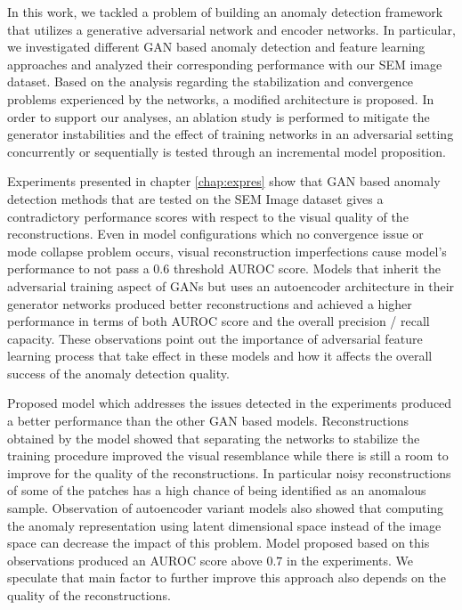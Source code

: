 
\begingroup

In this work, we tackled a problem of building an anomaly detection framework that utilizes a 
generative adversarial network and encoder networks. In particular, we investigated different 
GAN based anomaly detection and feature learning approaches and analyzed their corresponding 
performance with our SEM image dataset. Based on the analysis regarding the stabilization and 
convergence problems experienced by the networks, a modified architecture is proposed. In order to support 
our analyses, an ablation study is performed to mitigate the generator instabilities and the 
effect of training networks in an adversarial setting concurrently or sequentially is tested through 
an incremental model proposition.

Experiments presented in chapter \ref{chap:expres} show that GAN based anomaly detection methods that 
are tested on the SEM Image dataset gives a contradictory performance scores with respect to the visual 
quality of the reconstructions. Even in model configurations which no convergence issue or mode collapse problem 
occurs, visual reconstruction imperfections cause model's performance to not pass a $0.6$ threshold AUROC score.
Models that inherit the adversarial training aspect of GANs but uses an autoencoder architecture in 
their generator networks produced better reconstructions and achieved a higher performance in terms 
of both AUROC score and the overall precision / recall capacity. These observations point out the importance 
of adversarial feature learning process that take effect in these models and how it affects the overall success 
of the anomaly detection quality.

Proposed model which addresses the issues detected in the experiments produced a better performance 
than the other GAN based models. Reconstructions obtained by the model showed that separating the networks 
to stabilize the training procedure improved the visual resemblance while there is still a room to improve 
for the quality of the reconstructions. In particular noisy reconstructions of some of the patches has a high 
chance of being identified as an anomalous sample. Observation of autoencoder variant models also showed 
that computing the anomaly representation using latent dimensional space instead of the image space can 
decrease the impact of this problem. Model proposed based on this observations produced an AUROC score above 
$0.7$ in the experiments. We speculate that main factor to further improve this approach also depends 
on the quality of the reconstructions.

